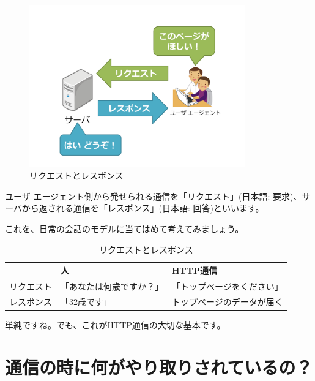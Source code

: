 \documentclass[a4j,11pt,openany]{jsbook}
\begin{document}
\begin{figure}[H]
    \begin{center}
        \includegraphics[height=7cm]{./req_res_2.png}
        \caption{リクエストとレスポンス}
        \label{req_res_2}
    \end{center}
\end{figure}

ユーザ エージェント側から発せられる通信を「リクエスト」(日本語: 要求)、サーバから返される通信を「レスポンス」(日本語: 回答)といいます。

これを、日常の会話のモデルに当てはめて考えてみましょう。

\begin{table}[H]
  \begin{small}
  \begin{center} 
	\caption{リクエストとレスポンス}
	\label{req_res_model}
	\begin{tabular}{|c||l|l|} \hline
		             & 人                        & HTTP通信 \\ \hline \hline
		リクエスト   & 「あなたは何歳ですか？」  & 「トップページをください」 \\ \hline
      	レスポンス   & 「32歳です」              & トップページのデータが届く  \\ \hline
	\end{tabular}
  \end{center}
  \end{small}
\end{table}

単純ですね。でも、これがHTTP通信の大切な基本です。


\chapter{通信の時に何がやり取りされているの？}
\end{document}
